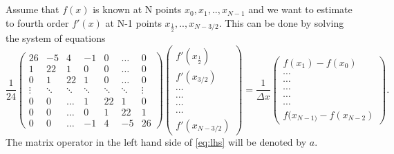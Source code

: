 \documentclass[12pt,reqno]{amsart}
\theoremstyle{definition}
\numberwithin{equation}{section}
\begin{document}
			\section{}\label{appendix}
			Assume that $f(x)$ is known at N points $x_0,x_1, ..,x_{N-1}$
			and we want to estimate to fourth order $f'(x)$ at N-1 points
			$x_{\frac{1}{2}},..,x_{N-3/2}$. This can be done  by solving the system of equations
			\begin{equation}\label{eq:lhs}
				\frac{1}{24}
				\begin{pmatrix}
					26     & -5     & 4      & -1     & 0      & \dots  & 0      \\
					1      & 22     & 1      & 0      & 0      & \dots  & 0      \\
					0      & 1      & 22     & 1      & 0      & \dots  & 0      \\
					\vdots & \ddots & \ddots & \ddots & \ddots & \ddots & \vdots \\
					0      & 0      & \dots  & 1      & 22     & 1      & 0      \\
					0      & 0      & \dots  & 0      & 1      & 22     & 1      \\
					0      & 0      & \dots  & -1     & 4      & -5     & 26
				\end{pmatrix}
				\begin{pmatrix}
					f'(x_{\frac{1}{2}}) \\
					f'(x_{3/2}) \\
					\cdots \\
					\cdots\\
					\cdots \\
					\cdots \\
					f'(x_{N-3/2})
				\end{pmatrix}=
				\frac{1}{\Delta x}
				\begin{pmatrix}
					f(x_{1})-f(x_0)  \\
					\cdots \\
					\cdots\\
					\cdots \\
					\cdots \\
					\cdots \\
					f(x_{N-1)}-f(x_{N-2})
				\end{pmatrix}.
			\end{equation}
		The matrix operator in the left hand side of \eqref{eq:lhs} will be denoted by $a$.
\end{document}

